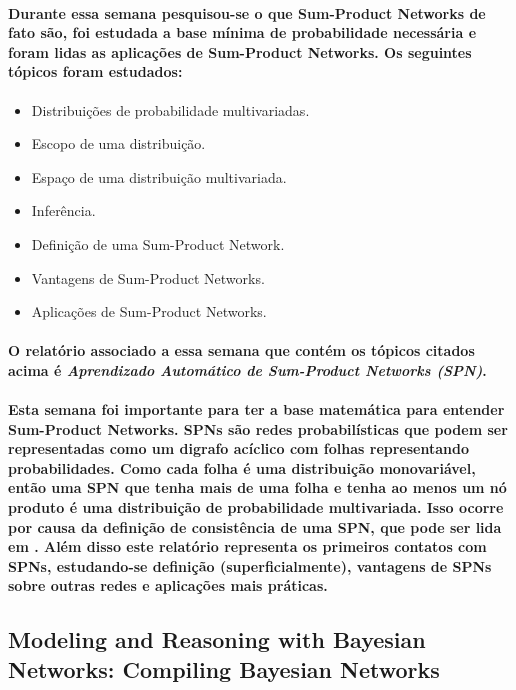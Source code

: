 \documentclass[a4paper,10pt]{article}
\theoremstyle{plain}
\begin{document}
\paragraph{
  Durante essa semana pesquisou-se o que Sum-Product Networks de fato são, foi estudada a base
  mínima de probabilidade necessária e foram lidas as aplicações de Sum-Product Networks. Os
  seguintes tópicos foram estudados:
}

\begin{itemize}
  \item Distribuições de probabilidade multivariadas.
  \item Escopo de uma distribuição.
  \item Espaço de uma distribuição multivariada.
  \item Inferência.
  \item Definição de uma Sum-Product Network.
  \item Vantagens de Sum-Product Networks.
  \item Aplicações de Sum-Product Networks.
\end{itemize}

\paragraph{
  O relatório associado a essa semana que contém os tópicos citados acima é \textit{Aprendizado
  Automático de Sum-Product Networks (SPN)}\cite{project-def}.
}

\paragraph{
  Esta semana foi importante para ter a base matemática para entender Sum-Product Networks. SPNs
  são redes probabilísticas que podem ser representadas como um digrafo acíclico com
  folhas representando probabilidades. Como cada folha é uma distribuição monovariável, então uma
  SPN que tenha mais de uma folha e tenha ao menos um nó produto é uma distribuição de
  probabilidade multivariada. Isso ocorre por causa da definição de consistência de uma SPN, que
  pode ser lida em \cite{report-9}. Além disso este relatório representa os primeiros contatos com
  SPNs, estudando-se definição (superficialmente), vantagens de SPNs sobre outras redes e
  aplicações mais práticas.
}

\subsection{Modeling and Reasoning with Bayesian Networks: Compiling Bayesian Networks}
\end{document}
